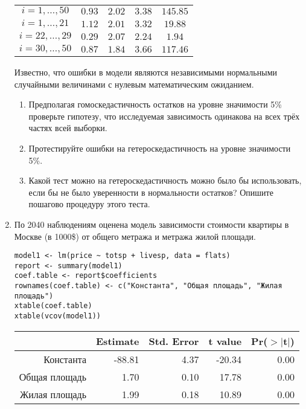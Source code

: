 \documentclass[12pt, a4paper]{article}
\theoremstyle{definition}
\begin{document}
\begin{enumerate}
\begin{tabular}{c|cccc}
\hline
$i=1,\ldots, 50$ & $0.93$ & $2.02$ & $3.38$ & $145.85$ \\
$i=1,\ldots, 21$ & $1.12$ & $2.01$ & $3.32$ & $19.88$ \\
$i=22,\ldots, 29$ & $0.29$ & $2.07$ & $2.24$ & $1.94$ \\
$i=30,\ldots, 50$ & $0.87$ & $1.84$ & $3.66$ & $117.46$ \\
\end{tabular}

Известно, что ошибки в модели являются независимыми нормальными случайными величинами с нулевым математическим ожиданием.

\begin{enumerate}
\item Предполагая гомоскедастичность остатков на уровне значимости 5\% проверьте гипотезу, что исследуемая зависимость одинакова на всех трёх частях всей выборки.
\item Протестируйте ошибки на гетероскедастичность на уровне значимости 5\%.
\item Какой тест можно на гетероскедастичность можно было бы использовать, если бы не было уверенности в нормальности остатков? Опишите пошагово процедуру этого теста.
\end{enumerate}


\item По 2040 наблюдениям оценена модель зависимости стоимости квартиры в Москве (в 1000\$) от общего метража и метража жилой площади.
\begin{verbatim}
model1 <- lm(price ~ totsp + livesp, data = flats)
report <- summary(model1)
coef.table <- report$coefficients
rownames(coef.table) <- c("Константа", "Общая площадь", "Жилая площадь")
xtable(coef.table)
xtable(vcov(model1))
\end{verbatim}

\begin{table}[ht]
\centering
\begin{tabular}{rrrrr}
  \hline
 & Estimate & Std. Error & t value & Pr($>$$|$t$|$) \\
  \hline
Константа & -88.81 & 4.37 & -20.34 & 0.00 \\
  Общая площадь & 1.70 & 0.10 & 17.78 & 0.00 \\
  Жилая площадь & 1.99 & 0.18 & 10.89 & 0.00 \\
   \hline
\end{tabular}
\end{table}


\end{enumerate}
\end{document}
